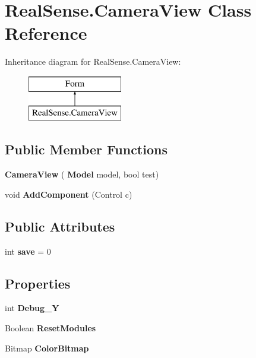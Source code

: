 \section{Real\+Sense.\+Camera\+View Class Reference}
\label{class_real_sense_1_1_camera_view}
Inheritance diagram for Real\+Sense.\+Camera\+View\+:\begin{figure}[H]
\begin{center}
\leavevmode
\includegraphics[height=2.000000cm]{class_real_sense_1_1_camera_view}
\end{center}
\end{figure}
\subsection*{Public Member Functions}
\begin{DoxyCompactItemize}
\item 
\textbf{ Camera\+View} (\textbf{ Model} model, bool test)
\item 
\mbox{\label{class_real_sense_1_1_camera_view_a67c8ee2cdbf0caf43e48043d90c0d549}} 
void {\bfseries Add\+Component} (Control c)
\end{DoxyCompactItemize}
\subsection*{Public Attributes}
\begin{DoxyCompactItemize}
\item 
\mbox{\label{class_real_sense_1_1_camera_view_a78ec68053fa36d321ce259f1d23e1d51}} 
int {\bfseries save} = 0
\end{DoxyCompactItemize}
\subsection*{Properties}
\begin{DoxyCompactItemize}
\item 
\mbox{\label{class_real_sense_1_1_camera_view_a5cc5cea08df7b36da52efba2a166e361}} 
int {\bfseries Debug\+\_\+Y}\hspace{0.3cm}{\ttfamily  [get, set]}
\item 
\mbox{\label{class_real_sense_1_1_camera_view_a342611e6157bb18b9c097186b3b9bee0}} 
Boolean {\bfseries Reset\+Modules}\hspace{0.3cm}{\ttfamily  [set]}
\item 
\mbox{\label{class_real_sense_1_1_camera_view_a487ce7be920e8f6742d704d97a6057dc}} 
Bitmap {\bfseries Color\+Bitmap}\hspace{0.3cm}{\ttfamily  [get]}
\end{DoxyCompactItemize}


